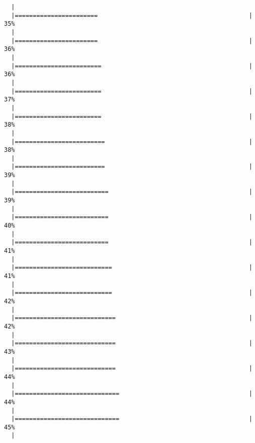 \begin{knitrout}
\begin{kframe}
\begin{verbatim}
  |                                                                       
  |=======================                                          |  35%
  |                                                                       
  |=======================                                          |  36%
  |                                                                       
  |========================                                         |  36%
  |                                                                       
  |========================                                         |  37%
  |                                                                       
  |========================                                         |  38%
  |                                                                       
  |=========================                                        |  38%
  |                                                                       
  |=========================                                        |  39%
  |                                                                       
  |==========================                                       |  39%
  |                                                                       
  |==========================                                       |  40%
  |                                                                       
  |==========================                                       |  41%
  |                                                                       
  |===========================                                      |  41%
  |                                                                       
  |===========================                                      |  42%
  |                                                                       
  |============================                                     |  42%
  |                                                                       
  |============================                                     |  43%
  |                                                                       
  |============================                                     |  44%
  |                                                                       
  |=============================                                    |  44%
  |                                                                       
  |=============================                                    |  45%
  |                                                                       

\end{verbatim}
\end{kframe}
\end{knitrout}
